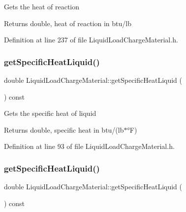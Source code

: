 Gets the heat of reaction \begin{DoxyReturn}{Returns}
double, heat of reaction in btu/lb 
\end{DoxyReturn}


Definition at line 237 of file Liquid\+Load\+Charge\+Material.\+h.

\mbox{\label{class_liquid_load_charge_material_aa698f1f73dff91951139a4a50582963d}} 
\subsubsection{\texorpdfstring{get\+Specific\+Heat\+Liquid()}{getSpecificHeatLiquid()}\hspace{0.1cm}{\footnotesize\ttfamily [1/3]}}
{\footnotesize\ttfamily double Liquid\+Load\+Charge\+Material\+::get\+Specific\+Heat\+Liquid (\begin{DoxyParamCaption}{ }\end{DoxyParamCaption}) const\hspace{0.3cm}{\ttfamily [inline]}}

Gets the specific heat of liquid \begin{DoxyReturn}{Returns}
double, specific heat in btu/(lb$\ast$°F) 
\end{DoxyReturn}


Definition at line 93 of file Liquid\+Load\+Charge\+Material.\+h.

\mbox{\label{class_liquid_load_charge_material_aa698f1f73dff91951139a4a50582963d}} 
\subsubsection{\texorpdfstring{get\+Specific\+Heat\+Liquid()}{getSpecificHeatLiquid()}\hspace{0.1cm}{\footnotesize\ttfamily [2/3]}}
{\footnotesize\ttfamily double Liquid\+Load\+Charge\+Material\+::get\+Specific\+Heat\+Liquid (\begin{DoxyParamCaption}{ }\end{DoxyParamCaption}) const\hspace{0.3cm}{\ttfamily [inline]}}

